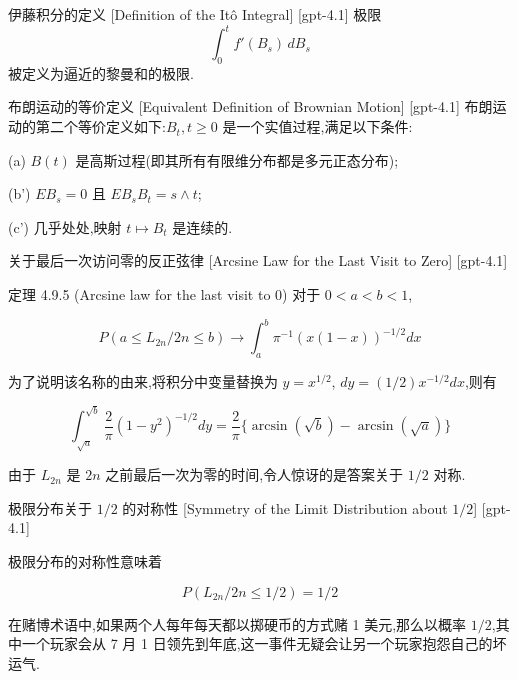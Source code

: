 \documentclass[UTF8]{ctexart}
\begin{document}
    
    
    \begin{dfn}
        {伊藤积分的定义}
        [Definition of the Itô Integral]
        [gpt-4.1]
        极限
\[
\int_{0}^{t} f'(B_{s})\, dB_{s}
\]
被定义为逼近的黎曼和的极限.
    \end{dfn}
    
    
    
    \begin{dfn}
        {布朗运动的等价定义}
        [Equivalent Definition of Brownian Motion]
        [gpt-4.1]
        布朗运动的第二个等价定义如下:$B_t, t \geq 0$ 是一个实值过程,满足以下条件:

(a) $B(t)$ 是高斯过程(即其所有有限维分布都是多元正态分布);

(b') $E B_s = 0$ 且 $E B_s B_t = s \wedge t$;

(c') 几乎处处,映射 $t \mapsto B_t$ 是连续的.

    \end{dfn}
    
    
    
    \begin{thm}
        {关于最后一次访问零的反正弦律}
        [Arcsine Law for the Last Visit to Zero]
        [gpt-4.1]
        
定理 4.9.5 (Arcsine law for the last visit to 0) 对于 $0 < a < b < 1$,

\[
P(a \leq L_{2n} / 2n \leq b) \to \int_{a}^{b} \pi^{-1} (x(1-x))^{-1/2} dx
\]

为了说明该名称的由来,将积分中变量替换为 $y = x^{1/2}$, $dy = (1/2) x^{-1/2} dx$,则有

\[
\int_{\sqrt{a}}^{\sqrt{b}} \frac{2}{\pi} (1 - y^2)^{-1/2} dy = \frac{2}{\pi} \{ \arcsin(\sqrt{b}) - \arcsin(\sqrt{a}) \}
\]

由于 $L_{2n}$ 是 $2n$ 之前最后一次为零的时间,令人惊讶的是答案关于 $1/2$ 对称.

    \end{thm}
    
    
    
    \begin{crl}
        {极限分布关于 $1/2$ 的对称性}
        [Symmetry of the Limit Distribution about $1/2$]
        [gpt-4.1]
        
极限分布的对称性意味着

\[
P(L_{2n} / 2n \leq 1/2) = 1/2
\]

在赌博术语中,如果两个人每年每天都以掷硬币的方式赌 1 美元,那么以概率 $1/2$,其中一个玩家会从 7 月 1 日领先到年底,这一事件无疑会让另一个玩家抱怨自己的坏运气.

    \end{crl}
    
\end{document}
